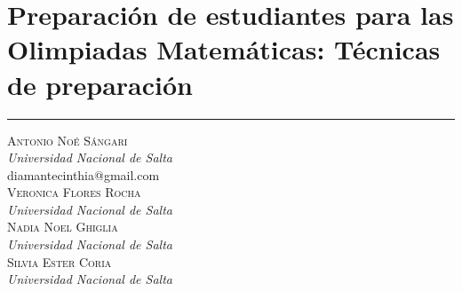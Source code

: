 \thispagestyle{portadapage}
\setcounter{subsection}{0}
\setcounter{subsubsection}{0}
\setcounter{actividad}{0}
\setcounter{actividad_previa}{0}
\setcounter{actividad_entre}{0}
\renewcommand{\articulotipo}{Taller}
\renewcommand{\articulotitulo}{Preparación de estudiantes para las Olimpiadas Matemáticas: Técnicas de preparación}
\renewcommand{\articulotitulocorto}{Preparación de estudiantes para las Olimpiadas Matemáticas: Técnicas de preparación}
\section{\articulotitulo}

\noindent\rule{\linewidth}{2pt}

\vspace{0.25cm}

\begin{flushright}
	{\Large \scshape
		Antonio Noé Sángari
	}\\
	{\large \itshape
		Universidad Nacional de Salta
	}\\
	{\ttfamily \small
		diamantecinthia@gmail.com
	}\\
	\vspace{1em}
	{\Large \scshape
		Veronica Flores Rocha
	}\\
	{\large \itshape
		Universidad Nacional de Salta
	}\\
	\vspace{1em}
	{\Large \scshape
		Nadia Noel Ghiglia
	}\\
	{\large \itshape
		Universidad Nacional de Salta
	}\\
	\vspace{1em}
	{\Large \scshape
		Silvia Ester Coria
	}\\
	{\large \itshape
		Universidad Nacional de Salta
	}
\end{flushright}

\vspace{0.5cm}

